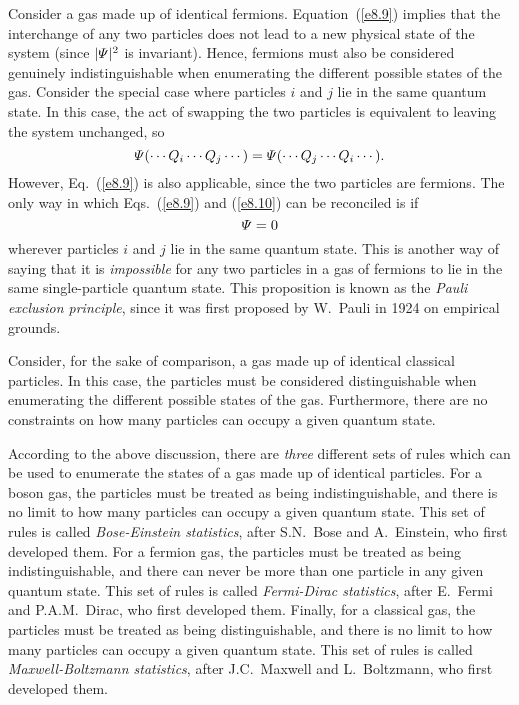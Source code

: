 Consider a gas made up of identical fermions. Equation~(\ref{e8.9}) 
implies that the interchange of any two particles does not
lead to a new physical state of the system (since $|{\mit\Psi}|^2$
is invariant). Hence, fermions must also be
considered  genuinely indistinguishable when enumerating the different possible
states of the gas. Consider the special case where particles $i$ and $j$ lie in
the same quantum state. In this case, the act of swapping the two
particles is equivalent to leaving the system unchanged, so
\begin{equation}
{\mit\Psi}(\cdots Q_i\cdots Q_j\cdots)=
{\mit\Psi}(\cdots Q_j\cdots Q_i\cdots). \label{e8.10}
\end{equation}
However, Eq.~(\ref{e8.9}) is also applicable, since the two particles
are fermions. The only way in which Eqs.~(\ref{e8.9}) and (\ref{e8.10}) can
be reconciled is if
\begin{equation}
{\mit\Psi} = 0
\end{equation}
wherever particles $i$ and $j$ lie in the same quantum state. This
is another way of saying that it is  {\em impossible}\/ for any two
particles  in a gas of  fermions to lie
 in the same single-particle quantum state. This proposition is known
as the {\em Pauli exclusion principle}, since it was first proposed
by W.~Pauli in 1924 on empirical grounds. 

Consider, for the sake of comparison, a gas made up of identical
classical particles. In this case, the particles must be considered
distinguishable when enumerating the different possible
states of the gas. Furthermore, there are no constraints on 
how many particles can occupy a
 given quantum state.

According to the above discussion, there are {\em three}\/  different sets of rules
which can be  used to enumerate the states of a gas made up of identical
particles. For a boson gas, the particles must be treated as
being indistinguishable, and there is no limit to how many particles
can occupy a given quantum state. This set of rules is called {\em Bose-Einstein
statistics}, after S.N.~Bose and A.~Einstein, who first developed them.
For a fermion gas, the particles must be treated as
being indistinguishable, and there can never be more than one particle in
any given quantum state. This set of rules is called {\em Fermi-Dirac
statistics}, after E.~Fermi and P.A.M.~Dirac, who first developed them.
Finally, for a classical gas, the particles 
 must be treated as
being distinguishable, and there is no limit to how many particles
can occupy a given quantum state. This set of rules is called
{\em Maxwell-Boltzmann statistics}, after J.C.~Maxwell and L.~Boltzmann,
who first developed them.

